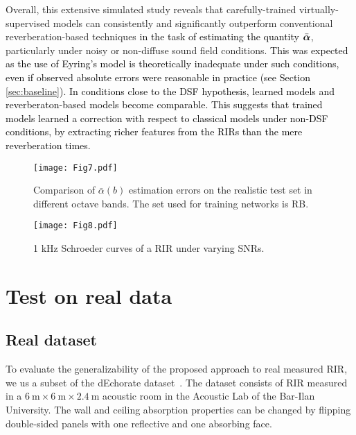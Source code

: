 \documentclass[reprint]{JASA}
\makeatletter
\newif\ifnotes
\newcommand{\note}[1]{\@bsphack\ifnotes{#1}\fi\@esphack}
\def\alphavect{\mbox{\boldmath $\alpha$}}
\makeatother
\begin{document}
Overall, this extensive simulated study reveals that carefully-trained virtually-supervised models can consistently and significantly outperform conventional reverberation-based techniques \textcolor{black}{in the task of estimating the quantity $\bar{\alphavect}$}, particularly under noisy or non-diffuse sound field conditions. \textcolor{black}{This was expected as the use of Eyring's model is theoretically inadequate under such conditions, even if observed absolute errors were reasonable in practice (see Section \ref{sec:baseline}). In conditions close to the DSF hypothesis, learned models and reverberaton-based models become comparable. This suggests that trained models learned a correction with respect to classical models under non-DSF conditions, by extracting richer features from the RIRs than the mere reverberation times.}

\begin{figure*}[!t]
	\centering
	\begin{minipage}{0.68\textwidth}
		\centering
		\texttt{[image: Fig7.pdf]}
		\caption{\label{fig:err_octave}Comparison of $\bar{\alpha}(b)$ estimation errors on the realistic test set in different octave bands. The set used for training networks is RB.}
	\end{minipage}
	\hfill
	\begin{minipage}{0.29\textwidth}
		\centering
		\texttt{[image: Fig8.pdf]}
		\caption{\label{fig:schroeder_curves}1 kHz Schroeder curves of a RIR under varying SNRs.}
	\end{minipage}
\end{figure*}

\section{Test on real data}
\label{sec:real_results} 

\subsection{Real dataset}
To evaluate the generalizability of the proposed approach to real measured RIR, we us a subset of the dEchorate dataset~\cite[paper under review]{di2021dechorate}. The dataset consists of RIR measured in a $6~\textrm{m} \times 6~\textrm{m} \times 2.4~\textrm{m}$ acoustic room in the Acoustic Lab of the Bar-Ilan University. The wall and ceiling absorption properties can be changed by flipping double-sided panels with one reflective and one absorbing face.
\note{\sout{This allows obtaining different room configurations, each characterized by a different prominence of early reflections and reverberation levels.}}
\end{document}
